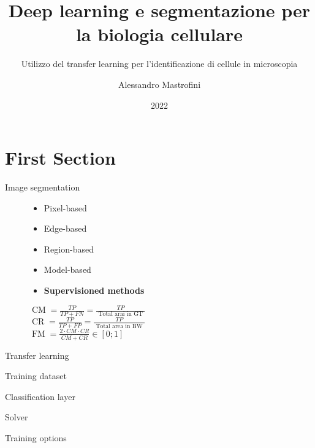 \documentclass[aspectratio=169,xcolor=dvipsnames]{beamer}
\title[short title]{Deep learning e segmentazione per la biologia cellulare} %
\subtitle{Utilizzo del transfer learning per l'identificazione di cellule in microscopia}
\author[Pin-Yen] {Alessandro Mastrofini}
\institute[NTU] %
{
Elaborazione di Immagini \\
Università degli Studi di Roma Tor Vergata%
}
\date{2022} %
\begin{document}
\begin{frame}
    \titlepage
\end{frame}

\section{First Section}

\begin{frame}{Image segmentation}
	\begin{figure}
	\centering
\begin{minipage}{0.5\linewidth}
\begin{itemize}
	\item Pixel-based
	\item Edge-based
	\item Region-based
	\item Model-based
	\item \textbf{Supervisioned methods}
\end{itemize}
\vspace{0.1\linewidth}

\small{$\operatorname{CM}=\frac{T P}{T P+F N}=\frac{T P}{\text { Total arai in GT }}$}\\


\small{$
\operatorname{CR}=\frac{T P}{T P+F P}=\frac{T P}{\text { Total area in BW }}$}\\


\small{$
\operatorname{FM}=\frac{2 \cdot CM \cdot C R}{C M+C R} \in[0 ; 1]
$}

\end{minipage}
\begin{minipage}{0.35\linewidth}
\tiny{\def\svgwidth{\linewidth}
 }
\end{minipage}
\end{figure}
\end{frame}

\begin{frame}{Transfer learning}
	
	
\end{frame}

\begin{frame}{Training dataset}
	
	
\end{frame}

\begin{frame}{Classification layer}
	
\end{frame}

\begin{frame}{Solver}
	
	
\end{frame}

\begin{frame}{Training options}
	
	
\end{frame}
\end{document}
